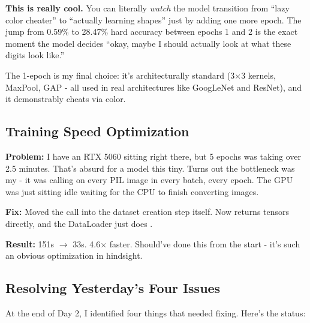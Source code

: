 \documentclass[9pt,a4paper,twocolumn,twoside]{tau-class/tau}
\begin{document}
        \begin{note}
            \textbf{This is really cool.} You can literally \textit{watch} the model transition from ``lazy color cheater'' to ``actually learning shapes'' just by adding one more epoch. The jump from 0.59\% to 28.47\% hard accuracy between epochs 1 and 2 is the exact moment the model decides ``okay, maybe I should actually look at what these digits look like.''

            The 1-epoch  is my final choice: it's architecturally standard (3$\times$3 kernels, MaxPool, GAP - all used in real architectures like GoogLeNet and ResNet), and it demonstrably cheats via color.
        \end{note}

    \subsection{Training Speed Optimization}

        \begin{tauenv}[frametitle=Issue: GPU Available But Training Slow]
            \textbf{Problem:} I have an RTX 5060 sitting right there, but 5 epochs was taking over 2.5 minutes. That's absurd for a model this tiny. Turns out the bottleneck was my  - it was calling  on every PIL image in every batch, every epoch. The GPU was just sitting idle waiting for the CPU to finish converting images.

            \textbf{Fix:} Moved the  call into the dataset creation step itself. Now  returns tensors directly, and the DataLoader just does .

            \textbf{Result:} 151s $\rightarrow$ 33s. 4.6$\times$ faster. Should've done this from the start - it's such an obvious optimization in hindsight.
        \end{tauenv}

    \subsection{Resolving Yesterday's Four Issues}

        At the end of Day 2, I identified four things that needed fixing. Here's the status:
\end{document}
